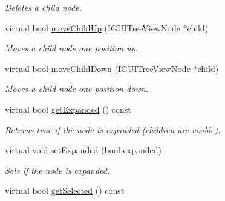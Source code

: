 \begin{DoxyCompactItemize}
\begin{DoxyCompactList}\small\item\em Deletes a child node. \end{DoxyCompactList}\item 
\hypertarget{classirr_1_1gui_1_1_c_g_u_i_tree_view_node_a1b4d7eb6637fdd449b230ee177112ad5}{virtual bool \hyperlink{classirr_1_1gui_1_1_c_g_u_i_tree_view_node_a1b4d7eb6637fdd449b230ee177112ad5}{move\-Child\-Up} (I\-G\-U\-I\-Tree\-View\-Node $\ast$child)}\label{classirr_1_1gui_1_1_c_g_u_i_tree_view_node_a1b4d7eb6637fdd449b230ee177112ad5}

\begin{DoxyCompactList}\small\item\em Moves a child node one position up. \end{DoxyCompactList}\item 
\hypertarget{classirr_1_1gui_1_1_c_g_u_i_tree_view_node_afc9e83c121bb6fc5652579e2cdfa88e6}{virtual bool \hyperlink{classirr_1_1gui_1_1_c_g_u_i_tree_view_node_afc9e83c121bb6fc5652579e2cdfa88e6}{move\-Child\-Down} (I\-G\-U\-I\-Tree\-View\-Node $\ast$child)}\label{classirr_1_1gui_1_1_c_g_u_i_tree_view_node_afc9e83c121bb6fc5652579e2cdfa88e6}

\begin{DoxyCompactList}\small\item\em Moves a child node one position down. \end{DoxyCompactList}\item 
\hypertarget{classirr_1_1gui_1_1_c_g_u_i_tree_view_node_a4571b521e8f3b4c5e47de7fdb0096c72}{virtual bool \hyperlink{classirr_1_1gui_1_1_c_g_u_i_tree_view_node_a4571b521e8f3b4c5e47de7fdb0096c72}{get\-Expanded} () const }\label{classirr_1_1gui_1_1_c_g_u_i_tree_view_node_a4571b521e8f3b4c5e47de7fdb0096c72}

\begin{DoxyCompactList}\small\item\em Returns true if the node is expanded (children are visible). \end{DoxyCompactList}\item 
\hypertarget{classirr_1_1gui_1_1_c_g_u_i_tree_view_node_a67192337936e6de84176a6c4416c9e92}{virtual void \hyperlink{classirr_1_1gui_1_1_c_g_u_i_tree_view_node_a67192337936e6de84176a6c4416c9e92}{set\-Expanded} (bool expanded)}\label{classirr_1_1gui_1_1_c_g_u_i_tree_view_node_a67192337936e6de84176a6c4416c9e92}

\begin{DoxyCompactList}\small\item\em Sets if the node is expanded. \end{DoxyCompactList}\item 
\hypertarget{classirr_1_1gui_1_1_c_g_u_i_tree_view_node_a688f0bd0cc425360bccfbedab34a7e85}{virtual bool \hyperlink{classirr_1_1gui_1_1_c_g_u_i_tree_view_node_a688f0bd0cc425360bccfbedab34a7e85}{get\-Selected} () const }\label{classirr_1_1gui_1_1_c_g_u_i_tree_view_node_a688f0bd0cc425360bccfbedab34a7e85}


\end{DoxyCompactItemize}
